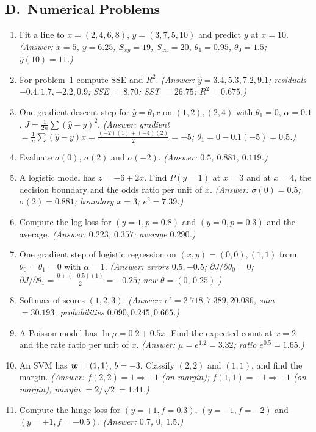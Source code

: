 \subsection*{D.\ Numerical Problems}
\begin{enumerate}
  \item Fit a line to $x=(2,4,6,8)$, $y=(3,7,5,10)$ and predict $y$ at $x=10$. \textit{(Answer: $\bar x=5$, $\bar y=6.25$, $S_{xy}=19$, $S_{xx}=20$, $\theta_1=0.95$, $\theta_0=1.5$; $\hat y(10)=11$.)}
  \item For problem~1 compute SSE and $R^2$. \textit{(Answer: $\hat y=3.4,5.3,7.2,9.1$; residuals $-0.4,1.7,-2.2,0.9$; SSE $=8.70$; SST $=26.75$; $R^2=0.675$.)}
  \item One gradient-descent step for $\hat y=\theta_1x$ on $(1,2),(2,4)$ with $\theta_1=0$, $\alpha=0.1$, $J=\frac1{2n}\sum(\hat y-y)^2$. \textit{(Answer: gradient $=\frac1n\sum(\hat y-y)x=\frac{(-2)(1)+(-4)(2)}{2}=-5$; $\theta_1=0-0.1(-5)=0.5$.)}
  \item Evaluate $\sigma(0)$, $\sigma(2)$ and $\sigma(-2)$. \textit{(Answer: $0.5$, $0.881$, $0.119$.)}
  \item A logistic model has $z=-6+2x$. Find $P(y=1)$ at $x=3$ and at $x=4$, the decision boundary and the odds ratio per unit of $x$. \textit{(Answer: $\sigma(0)=0.5$; $\sigma(2)=0.881$; boundary $x=3$; $e^{2}=7.39$.)}
  \item Compute the log-loss for $(y=1,p=0.8)$ and $(y=0,p=0.3)$ and the average. \textit{(Answer: $0.223$, $0.357$; average $0.290$.)}
  \item One gradient step of logistic regression on $(x,y)=(0,0),(1,1)$ from $\theta_0=\theta_1=0$ with $\alpha=1$. \textit{(Answer: errors $0.5,-0.5$; $\partial J/\partial\theta_0=0$; $\partial J/\partial\theta_1=\frac{0+(-0.5)(1)}2=-0.25$; new $\theta=(0,\,0.25)$.)}
  \item Softmax of scores $(1,2,3)$. \textit{(Answer: $e^z=2.718,7.389,20.086$, sum $=30.193$, probabilities $0.090,0.245,0.665$.)}
  \item A Poisson model has $\ln\mu=0.2+0.5x$. Find the expected count at $x=2$ and the rate ratio per unit of $x$. \textit{(Answer: $\mu=e^{1.2}=3.32$; ratio $e^{0.5}=1.65$.)}
  \item An SVM has $\boldsymbol{w}=(1,1)$, $b=-3$. Classify $(2,2)$ and $(1,1)$, and find the margin. \textit{(Answer: $f(2,2)=1\Rightarrow+1$ (on margin); $f(1,1)=-1\Rightarrow-1$ (on margin); margin $=2/\sqrt2=1.41$.)}
  \item Compute the hinge loss for $(y=+1,f=0.3)$, $(y=-1,f=-2)$ and $(y=+1,f=-0.5)$. \textit{(Answer: $0.7$, $0$, $1.5$.)}
\end{enumerate}

